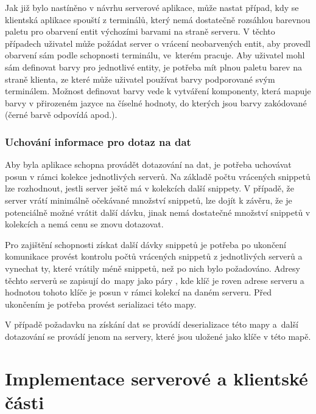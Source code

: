 Jak již bylo nastíněno v návrhu serverové aplikace, může nastat případ, kdy se klientská aplikace spouští z terminálů, který nemá dostatečně rozsáhlou barevnou paletu pro obarvení entit výchozími barvami na straně serveru. V těchto případech uživatel může požádat server o vrácení neobarvených entit, aby provedl obarvení sám podle schopnosti terminálu, ve~kterém pracuje. Aby uživatel mohl sám definovat barvy pro jednotlivé entity, je potřeba mít plnou paletu barev na straně klienta, ze které může uživatel používat barvy podporované svým terminálem. Možnost definovat barvy vede k vytváření komponenty, která mapuje barvy v přirozeném jazyce na číselné hodnoty, do kterých jsou barvy zakódované\,(černé barvě odpovídá \uv{\texttt{$\backslash$u001B[30m}} apod.). 



\subsection*{Uchování informace pro dotaz na  dat}
Aby byla aplikace schopna provádět dotazování na  dat, je potřeba uchovávat posun v rámci kolekce jednotlivých serverů. Na základě počtu vrácených snippetů lze rozhodnout, jestli server ještě má v kolekcích další snippety. V případě, že server vrátí minimálně očekávané množství snippetů, lze dojít k závěru, že je potenciálně možné vrátit další dávku, jinak nemá dostatečné množství snippetů v kolekcích a nemá cenu se  znovu dotazovat. 

Pro zajištění schopnosti získat další dávky snippetů je potřeba  po ukončení komunikace provést kontrolu počtů vrácených snippetů z jednotlivých serverů a vynechat ty, které vrátily méně snippetů, než po nich bylo požadováno. Adresy těchto serverů se zapisují do~mapy jako páry , kde klíč je roven adrese serveru a hodnotou tohoto klíče je posun v rámci kolekcí na daném serveru. Před ukončením je potřeba provést serializaci této mapy. 

V případě požadavku na získání  dat se provádí deserializace této mapy a~další dotazování se provádí jenom na servery, které jsou uložené jako klíče v této mapě.




\chapter{Implementace serverové a klientské části}
\label{chapter6}

